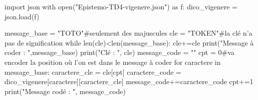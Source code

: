 \begin{python}
import json
with open("Epistemo-TD4-vigenere.json") as f:
  dico_vigenere = json.load(f)

message_base = "TOTO"#seulement des majuscules
cle = "TOKEN"#la clé n'a pas de signification
while len(cle)<len(message_base):
  cle+=cle
print("Message à coder : ",message_base)
print("Clé : ", cle)
message_code = ""
cpt = 0#va encoder la position où l'on est dans le message à coder
for caractere in message_base:
  caractere_cle = cle[cpt]
  caractere_code = dico_vigenere[caractere][caractere_cle]
  message_code+=caractere_code
  cpt+=1
print("Message codé : ", message_code)

\end{python}
